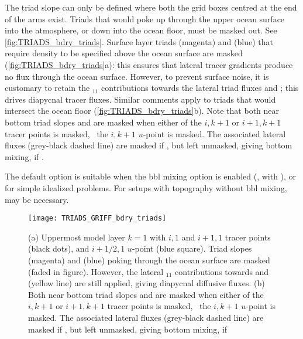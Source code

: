 \documentclass[../main/NEMO_manual]{subfiles}
\begin{document}
The triad slope can only be defined where both the grid boxes centred at the end of the arms exist.
Triads that would poke up through the upper ocean surface into the atmosphere,
or down into the ocean floor, must be masked out.
See \autoref{fig:TRIADS_bdry_triads}.
Surface layer triads  (magenta) and  (blue) that
require density to be specified above the ocean surface are masked (\autoref{fig:TRIADS_bdry_triads}a):
this ensures that lateral tracer gradients produce no flux through the ocean surface.
However, to prevent surface noise, it is customary to retain the $_{11}$ contributions towards
the lateral triad fluxes  and ;
this drives diapycnal tracer fluxes.
Similar comments apply to triads that would intersect the ocean floor (\autoref{fig:TRIADS_bdry_triads}b).
Note that both near bottom triad slopes  and  are masked when
either of the $i,k+1$ or $i+1,k+1$ tracer points is masked, \ie\ the $i,k+1$ $u$-point is masked.
The associated lateral fluxes (grey-black dashed line) are masked if ,
but left unmasked, giving bottom mixing, if .

The default option  is suitable when the bbl mixing option is enabled
(, with ), or for simple idealized problems.
For setups with topography without bbl mixing,  may be necessary.
\begin{figure}[h]
  \centering
  \texttt{[image: TRIADS\_GRIFF\_bdry\_triads]}
  \caption[Boundary triads]{
    (a) Uppermost model layer $k=1$ with $i,1$ and $i+1,1$ tracer points (black dots),
    and $i+1/2,1$ $u$-point (blue square).
    Triad slopes  (magenta) and
     (blue) poking through the ocean surface are masked
    (faded in figure).
    However,
    the lateral $_{11}$ contributions towards  and
     (yellow line) are still applied,
    giving diapycnal diffusive fluxes.
    \newline
    (b) Both near bottom triad slopes  and
     are masked when
    either of the $i,k+1$ or $i+1,k+1$ tracer points is masked,
    \ie\ the $i,k+1$ $u$-point is masked.
    The associated lateral fluxes (grey-black dashed line) are masked if
    \protect{}, but left unmasked,
    giving bottom mixing, if \protect{}}
  \label{fig:TRIADS_bdry_triads}
\end{figure}
\end{document}
